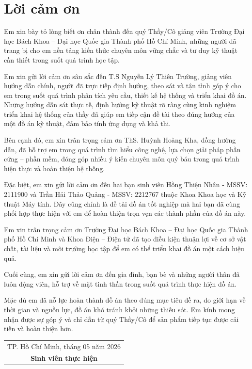 \chapter*{Lời cảm ơn}
Em xin bày tỏ lòng biết ơn chân thành đến quý Thầy/Cô giảng viên Trường Đại học Bách Khoa – Đại học Quốc gia Thành phố Hồ Chí Minh, những người đã trang bị cho em nền tảng kiến thức chuyên môn vững chắc và tư duy kỹ thuật cần thiết trong suốt quá trình học tập.

Em xin gửi lời cảm ơn sâu sắc đến T.S Nguyễn Lý Thiên Trường, giảng viên hướng dẫn chính, người đã trực tiếp định hướng, theo sát và tận tình góp ý cho em trong suốt quá trình phân tích yêu cầu, thiết kế hệ thống và triển khai đồ án. Những hướng dẫn sát thực tế, định hướng kỹ thuật rõ ràng cùng kinh nghiệm triển khai hệ thống của thầy đã giúp em tiếp cận đề tài theo đúng hướng của một đồ án kỹ thuật, đảm bảo tính ứng dụng và khả thi.

Bên cạnh đó, em xin trân trọng cảm ơn ThS. Huỳnh Hoàng Kha, đồng hướng dẫn, đã hỗ trợ em trong quá trình tìm hiểu công nghệ, lựa chọn giải pháp phần cứng – phần mềm, đóng góp nhiều ý kiến chuyên môn quý báu trong quá trình hiện thực và hoàn thiện hệ thống.

Đặc biệt, em xin gửi lời cảm ơn đến hai bạn sinh viên Hồng Thiện Nhân - MSSV: 2111900 và Trần Hải Thảo Quảng - MSSV: 2212767 thuộc Khoa Khoa học và Kỹ thuật Máy tính. Đây cũng chính là đề tài đồ án tốt nghiệp mà hai bạn đã cùng phối hợp thực hiện với em để hoàn thiện trọn vẹn các thành phần của đồ án này.

Em xin trân trọng cảm ơn Trường Đại học Bách Khoa – Đại học Quốc gia Thành phố Hồ Chí Minh và Khoa Điện – Điện tử đã tạo điều kiện thuận lợi về cơ sở vật chất, tài liệu và môi trường học tập để em có thể triển khai đồ án một cách hiệu quả.

Cuối cùng, em xin gửi lời cảm ơn đến gia đình, bạn bè và những người thân đã luôn động viên, hỗ trợ về mặt tinh thần trong suốt quá trình thực hiện đồ án.

Mặc dù em đã nỗ lực hoàn thành đồ án theo đúng mục tiêu đề ra, do giới hạn về thời gian và nguồn lực, đồ án khó tránh khỏi những thiếu sót. Em kính mong nhận được sự góp ý và chỉ dẫn từ quý Thầy/Cô để sản phẩm tiếp tục được cải tiến và hoàn thiện hơn.

\vspace{1.5em}

\begin{flushright}
    \begin{tabular}{c}
        TP. Hồ Chí Minh, tháng 05 năm 2026 \\
        \textbf{Sinh viên thực hiện}
    \end{tabular}
\end{flushright}